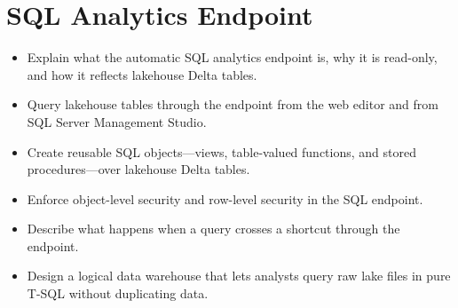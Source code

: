 \chapter{SQL Analytics Endpoint}
%

\begin{objectives}
\begin{itemize}
    \item Explain what the automatic SQL analytics endpoint is, why it is read-only, and how it reflects lakehouse Delta tables.
    \item Query lakehouse tables through the endpoint from the web editor and from SQL Server Management Studio.
    \item Create reusable SQL objects---views, table-valued functions, and stored procedures---over lakehouse Delta tables.
    \item Enforce object-level security and row-level security in the SQL endpoint.
    \item Describe what happens when a query crosses a shortcut through the endpoint.
    \item Design a logical data warehouse that lets analysts query raw lake files in pure T-SQL without duplicating data.
\end{itemize}
\end{objectives}

